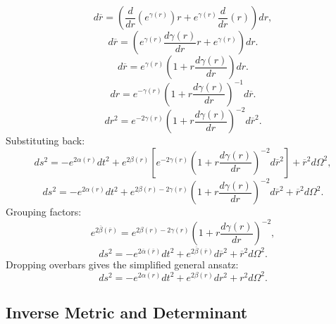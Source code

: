\documentclass[11pt, a4paper]{report}
\begin{document}
\begin{equation}
d\overline{r} = \left( \frac{d}{dr} \left( e^{\gamma(r)} \right) r + e^{\gamma(r)} \frac{d}{dr} (r) \right) dr,
\end{equation}
\begin{equation}
d\overline{r} = \left( e^{\gamma(r)} \frac{d\gamma(r)}{dr} r + e^{\gamma(r)} \right) dr.
\end{equation}
\begin{equation}
d\overline{r} = e^{\gamma(r)} \left( 1 + r \frac{d\gamma(r)}{dr} \right) dr.
\end{equation}
\begin{equation}
dr = e^{-\gamma(r)} \left( 1 + r \frac{d\gamma(r)}{dr} \right)^{-1} d\overline{r}.
\end{equation}
\begin{equation}
dr^2 = e^{-2\gamma(r)} \left( 1 + r \frac{d\gamma(r)}{dr} \right)^{-2} d\overline{r}^2.
\end{equation}
Substituting back:
\begin{equation}
ds^2 = -e^{2\alpha(r)} dt^2 + e^{2\beta(r)} \left[ e^{-2\gamma(r)} \left( 1 + r \frac{d\gamma(r)}{dr} \right)^{-2} d\overline{r}^2 \right] + \overline{r}^2 d\Omega^2,
\end{equation}
\begin{equation}
ds^2 = -e^{2\alpha(r)} dt^2 + e^{2\beta(r) - 2\gamma(r)} \left( 1 + r \frac{d\gamma(r)}{dr} \right)^{-2} d\overline{r}^2 + \overline{r}^2 d\Omega^2.
\end{equation}
Grouping factors:
\begin{equation}
e^{2\overline{\beta}(\overline{r})} = e^{2\beta(r) - 2\gamma(r)} \left( 1 + r \frac{d\gamma(r)}{dr} \right)^{-2},
\end{equation}
\begin{equation}
ds^2 = -e^{2\overline{\alpha}(\overline{r})} dt^2 + e^{2\overline{\beta}(\overline{r})} d\overline{r}^2 + \overline{r}^2 d\Omega^2.
\end{equation}
Dropping overbars gives the simplified general ansatz:
\begin{equation}
ds^2 = -e^{2\alpha(r)} dt^2 + e^{2\beta(r)} dr^2 + r^2 d\Omega^2.
\end{equation}

\subsection{Inverse Metric and Determinant}
\end{document}
